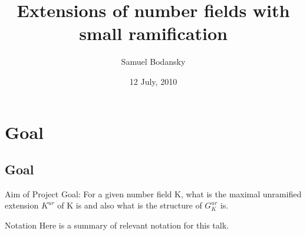 \documentclass[10pt]{beamer}
\title[Part C Dissertation] %
{Extensions of number fields with small ramification}
\subtitle
{}
\author %
{Samuel Bodansky}
\institute %
{
  University of Oxford
  }
\date %
{12 July, 2010}
\begin{document}
\begin{frame}
  \titlepage
\end{frame}







\section{Goal}
\subsection{Goal}
\begin{frame}{Aim of Project}
Goal: For a given number field K, what is the maximal unramified extension $K^{ur}$ of K is and also what is the structure of $G_K^{ur}$ is.

\end{frame}

\begin{frame}{Notation}
Here is a summary of relevant notation for this talk. 
\end{frame}
\end{document}
